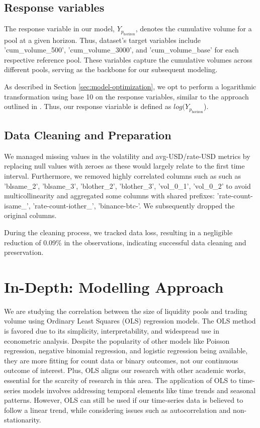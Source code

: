\documentclass{article}
\begin{document}
\subsection{Response variables}

The response variable in our model, \(Y_{p_{\text{horizon}}}\), denotes the cumulative volume for a pool at a given horizon. Thus, dataset's target variables include 'cum\_volume\_500', 'cum\_volume\_3000', and 'cum\_volume\_base' for each respective reference pool. These variables capture the cumulative volumes across different pools, serving as the backbone for our subsequent modeling.

As described in Section \ref{sec:model-optimization}, we opt to perform a logarithmic transformation using base 10 on the response variables, similar to the approach outlined in \cite{Miori2023}. 
Thus, our response viariable is defined as \(log(Y_{p_{\text{horizon}}}\)).


\subsection{Data Cleaning and Preparation}

We managed missing values in the volatility and avg-USD/rate-USD metrics by replacing null values with zeroes as these would largely relate to the first time interval. Furthermore, we removed highly correlated columns such as such as 'blsame\_2', 'blsame\_3', 'blother\_2', 'blother\_3', 'vol\_0\_1', 'vol\_0\_2' to avoid multicollinearity and aggregated some columns with shared prefixes: 'rate-count-isame\_', 'rate-count-iother\_', 'binance-btc-'. We subsequently dropped the original columns.

During the cleaning process, we tracked data loss, resulting in a negligible reduction of 0.09\% in the observations, indicating successful data cleaning and preservation.

\section{\textbf{In-Depth: Modelling Approach}}

We are studying the correlation between the size of liquidity pools and trading volume using Ordinary Least Squares (OLS) regression models. The OLS method is favored due to its simplicity, interpretability, and widespread use in econometric analysis. Despite the popularity of other models like Poisson regression, negative binomial regression, and logistic regression being available, they are more fitting for count data or binary outcomes, not our continuous outcome of interest. Plus, OLS aligns our research with other academic works\cite{Miori2023}, essential for the scarcity of research in this area. The application of OLS to time-series models involves addressing temporal elements like time trends and seasonal patterns. However, OLS can still be used if our time-series data is believed to follow a linear trend, while considering issues such as autocorrelation and non-stationarity.
\end{document}
